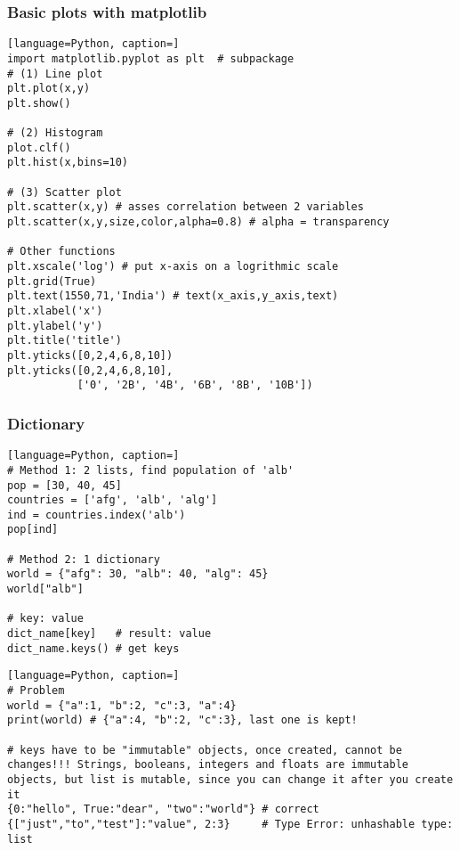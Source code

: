 \documentclass[12pt]{article}
\begin{document}
\subsubsection{\normalsize Basic plots with matplotlib}
\begin{lstlisting}[language=Python, caption=]
import matplotlib.pyplot as plt  # subpackage
# (1) Line plot
plt.plot(x,y)
plt.show()

# (2) Histogram
plot.clf()
plt.hist(x,bins=10)

# (3) Scatter plot
plt.scatter(x,y) # asses correlation between 2 variables
plt.scatter(x,y,size,color,alpha=0.8) # alpha = transparency

# Other functions
plt.xscale('log') # put x-axis on a logrithmic scale
plt.grid(True)
plt.text(1550,71,'India') # text(x_axis,y_axis,text)
plt.xlabel('x')
plt.ylabel('y')
plt.title('title')
plt.yticks([0,2,4,6,8,10])
plt.yticks([0,2,4,6,8,10],
           ['0', '2B', '4B', '6B', '8B', '10B'])
\end{lstlisting}

\subsubsection{\normalsize Dictionary}
\begin{lstlisting}[language=Python, caption=]
# Method 1: 2 lists, find population of 'alb'
pop = [30, 40, 45]
countries = ['afg', 'alb', 'alg']
ind = countries.index('alb')
pop[ind]

# Method 2: 1 dictionary 
world = {"afg": 30, "alb": 40, "alg": 45}
world["alb"]

# key: value
dict_name[key]   # result: value
dict_name.keys() # get keys
\end{lstlisting}

\begin{lstlisting}[language=Python, caption=]
# Problem
world = {"a":1, "b":2, "c":3, "a":4}
print(world) # {"a":4, "b":2, "c":3}, last one is kept!

# keys have to be "immutable" objects, once created, cannot be changes!!! Strings, booleans, integers and floats are immutable objects, but list is mutable, since you can change it after you create it
{0:"hello", True:"dear", "two":"world"} # correct
{["just","to","test"]:"value", 2:3}     # Type Error: unhashable type: list
\end{lstlisting}
\end{document}
